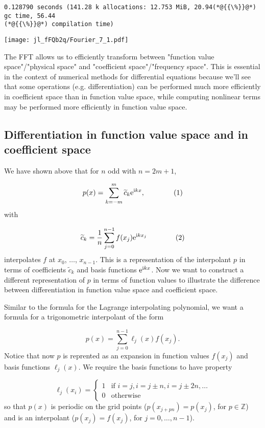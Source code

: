 \documentclass[12pt,a4paper]{article}
\begin{document}
\begin{lstlisting}
0.128790 seconds (141.28 k allocations: 12.753 MiB, 20.94(*@{{\%}}@*) gc time, 56.44
(*@{{\%}}@*) compilation time)
\end{lstlisting}

\texttt{[image: jl\_fFQb2q/Fourier\_7\_1.pdf]}

The FFT allows us to efficiently transform between "function value space"/"physical space" and "coefficient space"/"frequency space".  This is essential in the context of numerical methods for differential equations because we'll see that some operations (e.g. differentiation) can be performed much more efficiently in coefficient space than in function value space, while computing nonlinear terms may be performed more efficiently in function value space.   

\subsection{Differentiation in function value space and in coefficient space}
We have shown above that for $n$ odd with $n = 2m+1$,

\[
p(x) = \sum_{k=-m}^{m} \widetilde{c}_k{\rm e}^{{\rm i}kx},  \qquad \qquad (1)
\]
with

\[
\widetilde{c}_k = \frac{1}{n}\sum_{j=0}^{n-1}f(x_j){\rm e}^{{\rm i}kx_j}  \qquad  \qquad (2)
\]
interpolates $f$ at $x_0$, $\ldots$, $x_{n-1}$. This is a representation of the interpolant $p$ in terms of coefficients $\widetilde{c}_k$ and basis functions ${\rm e}^{{\rm i}kx}$.   Now we want to construct a different representation of $p$ in terms of function values to illustrate the difference between differentiation in function value space and coefficient space. 

Similar to the formula for the Lagrange interpolating polynomial, we want a formula for a trigonometric interpolant of the form

\[
p(x) = \sum_{j=0}^{n-1}\ell_{j}(x) f(x_{j}).
\]
Notice that now $p$ is reprented as an expansion in function values $f(x_{j})$ and basis functions $\ell_{j}(x)$. We require the basis functions to have property

\[
\ell_{j}(x_i) = \begin{cases}
1 & \text{if } i = j, i = j \pm n, i = j \pm 2n, \ldots \\
0 & \text{otherwise } 
\end{cases}
\]
so that $p(x)$ is periodic on the grid points ($p(x_{j + pn}) = p(x_{j})$, for $p \in \mathbb{Z}$) and is an interpolant ($p(x_{j}) = f(x_{j})$, for $j = 0, \ldots, n-1$). 
\end{document}
